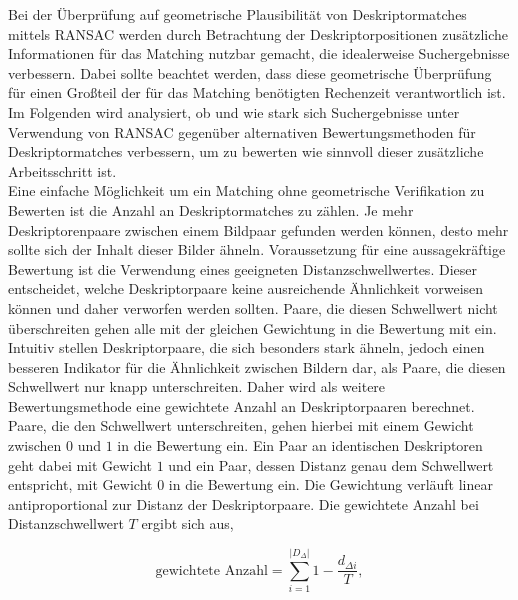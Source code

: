 Bei der Überprüfung auf geometrische Plausibilität von Deskriptormatches mittels RANSAC werden durch Betrachtung der Deskriptorpositionen zusätzliche Informationen für das Matching nutzbar gemacht, die idealerweise Suchergebnisse verbessern. Dabei sollte beachtet werden, dass diese geometrische Überprüfung für einen Großteil der für das Matching benötigten Rechenzeit verantwortlich ist. Im Folgenden wird analysiert, ob und wie stark sich Suchergebnisse unter Verwendung von RANSAC gegenüber alternativen Bewertungsmethoden für Deskriptormatches verbessern, um zu bewerten wie sinnvoll dieser zusätzliche Arbeitsschritt ist.
\\
Eine einfache Möglichkeit um ein Matching ohne geometrische Verifikation zu Bewerten ist die Anzahl an Deskriptormatches zu zählen. Je mehr Deskriptorenpaare zwischen einem Bildpaar gefunden werden können, desto mehr sollte sich der Inhalt dieser Bilder ähneln. Voraussetzung für eine aussagekräftige Bewertung ist die Verwendung eines geeigneten Distanzschwellwertes. Dieser entscheidet, welche Deskriptorpaare keine ausreichende Ähnlichkeit vorweisen können und daher verworfen werden sollten. Paare, die diesen Schwellwert nicht überschreiten gehen alle mit der gleichen Gewichtung in die Bewertung mit ein. 
\\
Intuitiv stellen Deskriptorpaare, die sich besonders stark ähneln, jedoch einen besseren Indikator für die Ähnlichkeit zwischen Bildern dar, als Paare, die diesen Schwellwert nur knapp unterschreiten. Daher wird als weitere Bewertungsmethode eine gewichtete Anzahl an Deskriptorpaaren berechnet. Paare, die den Schwellwert unterschreiten, gehen hierbei mit einem Gewicht zwischen $0$ und $1$ in die Bewertung ein. Ein Paar an identischen Deskriptoren geht dabei mit Gewicht $1$ und ein Paar, dessen Distanz genau dem Schwellwert entspricht, mit Gewicht $0$ in die Bewertung ein. Die Gewichtung verläuft linear antiproportional zur Distanz der Deskriptorpaare. Die gewichtete Anzahl bei Distanzschwellwert $T$ ergibt sich aus,

\begin{equation}
\text{gewichtete Anzahl} = \sum_{i=1}^{|D_\Delta|}{1 - \frac{d_{\Delta i}}{T}},
\end{equation}

